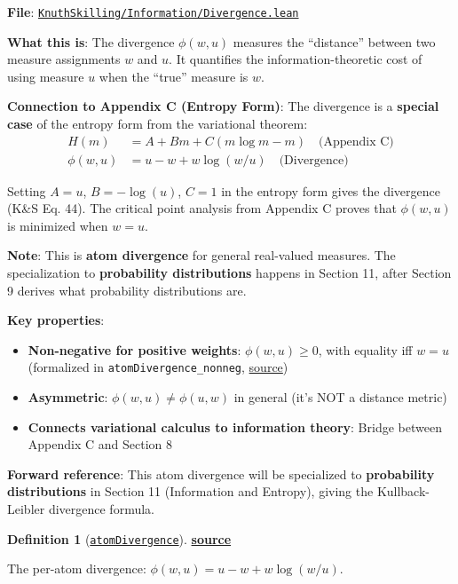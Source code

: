 \documentclass[11pt]{article}
\theoremstyle{definition}
\newtheorem{definition}[theorem]{Definition}
\theoremstyle{remark}
\begin{document}
\textbf{File}: \href{https://github.com/zariuq/ks-foundations-of-inference/blob/main/KnuthSkilling/Information/Divergence.lean}{\texttt{KnuthSkilling/Information/Divergence.lean}}

\textbf{What this is}: The divergence $\phi(w, u)$ measures the ``distance'' between two measure assignments $w$ and $u$. It quantifies the information-theoretic cost of using measure $u$ when the ``true'' measure is $w$.

\textbf{Connection to Appendix C (Entropy Form)}: The divergence is a \textbf{special case} of the entropy form from the variational theorem:
\begin{align*}
H(m) &= A + Bm + C(m \log m - m) \quad \text{(Appendix C)} \\
\phi(w, u) &= u - w + w \log(w/u) \quad \text{(Divergence)}
\end{align*}

Setting $A = u$, $B = -\log(u)$, $C = 1$ in the entropy form gives the divergence (K\&S Eq. 44). The critical point analysis from Appendix C proves that $\phi(w, u)$ is minimized when $w = u$.

\textbf{Note}: This is \textbf{atom divergence} for general real-valued measures. The specialization to \textbf{probability distributions} happens in Section 11, after Section 9 derives what probability distributions are.

\textbf{Key properties}:
\begin{itemize}
\item \textbf{Non-negative for positive weights}: $\phi(w, u) \geq 0$, with equality iff $w = u$ (formalized in \texttt{atomDivergence\_nonneg}, \href{https://github.com/zariuq/ks-foundations-of-inference/blob/main/KnuthSkilling/Information/Divergence.lean}{source})
\item \textbf{Asymmetric}: $\phi(w, u) \neq \phi(u, w)$ in general (it's NOT a distance metric)
\item \textbf{Connects variational calculus to information theory}: Bridge between Appendix C and Section 8
\end{itemize}

\textbf{Forward reference}: This atom divergence will be specialized to \textbf{probability distributions} in Section 11 (Information and Entropy), giving the Kullback-Leibler divergence formula.

\begin{definition}[\href{https://github.com/zariuq/ks-foundations-of-inference/blob/main/KnuthSkilling/Information/Divergence.lean}{\texttt{atomDivergence}}]
\textbf{\href{https://github.com/zariuq/ks-foundations-of-inference/blob/main/KnuthSkilling/Information/Divergence.lean}{source}}

The per-atom divergence: $\phi(w, u) = u - w + w \log(w/u)$.
\end{definition}
\end{document}
